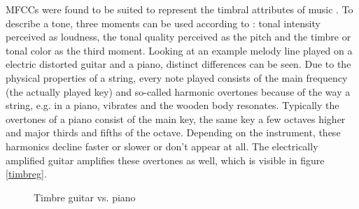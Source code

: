 \FloatBarrier
MFCCs were found to be suited to represent the timbral attributes of music \cite[p. 55 ff]{knees1}. To describe a tone, three moments can be used according to \cite[pp. 15]{musicdata}: tonal intensity perceived as loudness, the tonal quality perceived as the pitch and the timbre or tonal color as the third moment. Looking at an example melody line played on a electric distorted guitar and a piano, distinct differences can be seen. Due to the physical properties of a string, every note played consists of the main frequency (the actually played key) and so-called harmonic overtones because of the way a string, e.g. in a piano, vibrates and the wooden body resonates. Typically the overtones of a piano consist of the main key, the same key a few octaves higher and major thirds and fifths of the octave. Depending on the instrument, these harmonics decline faster or slower or don't appear at all. The electrically amplified guitar amplifies these overtones as well, which is visible in figure \ref{timbreg}.
\begin{figure}[htbp]
	\centering
	\caption{Timbre guitar vs. piano}	
	\label{fig:timbre}
\end{figure}
